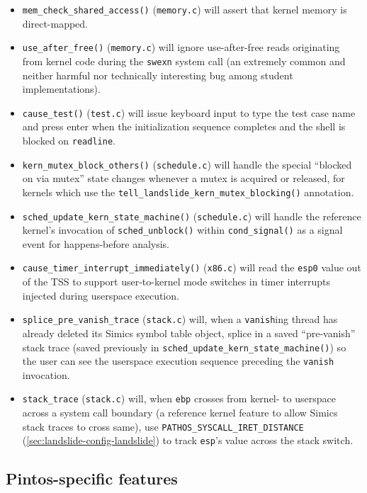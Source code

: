 \begin{itemize}
	\item {\tt mem\_check\_shared\_access()} ({\tt memory.c})
		will assert that kernel memory is direct-mapped.
	\item {\tt use\_after\_free()} ({\tt memory.c})
		will ignore use-after-free reads originating from kernel code during the {\tt swexn} system call
		(an extremely common and neither harmful nor technically interesting bug among student implementations).
	\item {\tt cause\_test()} ({\tt test.c})
		will issue keyboard input to type the test case name and press enter
		when the initialization sequence completes and the shell is blocked on {\tt readline}.
	\item {\tt kern\_mutex\_block\_others()} ({\tt schedule.c})
		will handle the special ``blocked on via mutex'' state changes
		whenever a mutex is acquired or released,
		for kernels which use the {\tt tell\_landslide\_kern\_mutex\_blocking()} annotation.
	\item {\tt sched\_update\_kern\_state\_machine()} ({\tt schedule.c})
		will handle the reference kernel's invocation of {\tt sched\_unblock()} within {\tt cond\_\allowbreak{}signal()}
		as a signal event for happens-before analysis.
	\item {\tt cause\_timer\_interrupt\_immediately()} ({\tt x86.c})
		will read the {\tt esp0} value out of the TSS to support user-to-kernel mode switches
		in timer interrupts injected during userspace execution.
	\item {\tt splice\_pre\_vanish\_trace} ({\tt stack.c})
		will, when a {\tt vanish}ing thread has already deleted its Simics symbol table object,
		splice in a saved ``pre-vanish'' stack trace
		(saved previously in {\tt sched\_update\_kern\_state\_machine()})
		so the user can see the userspace execution sequence preceding the {\tt vanish} invocation.
	\item {\tt stack\_trace} ({\tt stack.c})
		will, when {\tt ebp} crosses from kernel- to userspace across a system call boundary
		(a reference kernel feature to allow Simics stack traces to cross same),
		use {\tt PATHOS\_SYSCALL\_IRET\_DISTANCE} (\cref{sec:landslide-config-landslide})
		to track {\tt esp}'s value across the stack switch.
\end{itemize}


\subsection{Pintos-specific features}
\label{sec:landslide-pintosspecifics}

